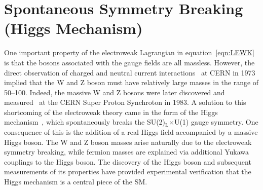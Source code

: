 \section{Spontaneous Symmetry Breaking (Higgs Mechanism)}
One important property of the electroweak Lagrangian in equation~\ref{eqn:LEWK} is that the bosons associated with the gauge fields are all massless. 
However, the direct observation of charged and neutral 
current interactions~\cite{HASERT1973121,HASERT1973138} at CERN in 1973 implied that the W and Z boson must have relatively large masses in the range of 50--100\GeV. Indeed, the massive W and Z bosons were later discovered and measured~\cite{UA1:1983crd,UA2:1983tsx} at the CERN Super Proton Synchroton in 1983. 
A solution to this shortcoming of the electroweak theory came in the form of the Higgs mechanism~\cite{Englert:1964et,Higgs:1964ia,Higgs:1964pj},
which spontaneously breaks the SU(2)$_{\mathrm{L}}$$\times$U(1) gauge symmetry. One consequence of this is the addition of a real 
Higgs field accompanied by a massive Higgs boson. The W and Z boson masses arise naturally due to the electroweak symmetry breaking, 
while fermion masses are explained via additional Yukawa couplings to the Higgs boson. 
The discovery of the Higgs boson and subsequent measurements of its properties have provided experimental verification that the Higgs mechanism 
is a central piece of the SM. 

